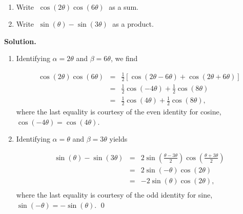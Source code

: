\documentclass{ximera}
\begin{document}
\begin{example}  \label{prodtosumtoprod} $~$

\begin{enumerate}

\item  Write $\; \cos(2\theta)\cos(6\theta) \;$ as a sum.

\item  \label{beatsprodsumex} Write $\; \sin(\theta) - \sin(3\theta) \;$ as a product.

\end{enumerate}

{\bf Solution.}

\begin{enumerate}

\item  Identifying $\alpha = 2\theta$ and $\beta = 6\theta$, we find

\vspace{-.15in}

\[\begin{array}{rcl}

\cos(2\theta)\cos(6\theta) & = &  \frac{1}{2} \left[ \cos(2\theta - 6\theta) + \cos(2\theta + 6\theta)\right]\\  
													 & = & \frac{1}{2} \cos(-4\theta) + \frac{1}{2}\cos(8\theta) \\  
													 & = & \frac{1}{2} \cos(4\theta) + \frac{1}{2} \cos(8\theta), \end{array} \]
where the last equality is courtesy of the even identity for cosine, $\cos(-4\theta) = \cos(4\theta)$.

\item  Identifying $\alpha = \theta$ and $\beta = 3\theta$ yields

\vspace{-.15in}

\[ \begin{array}{rcl}

\sin(\theta) - \sin(3\theta) & = &  2 \sin\left(  \frac{\theta - 3\theta}{2}\right)\cos\left(  \frac{\theta + 3\theta}{2}\right) \\  
														 & = &  2 \sin\left( -\theta \right)\cos\left( 2\theta \right) \\  
															& = &  -2 \sin\left( \theta \right)\cos\left( 2\theta \right), \\ \end{array}\]
where the last equality is courtesy of the odd identity for sine, $\sin(-\theta) = -\sin(\theta)$.  \qed

\end{enumerate}

\end{example}
\end{document}
